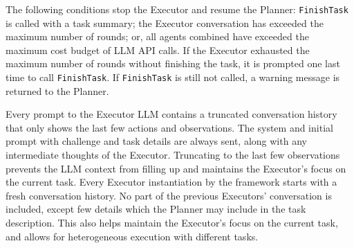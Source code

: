 The following conditions stop the Executor and resume the Planner:
\texttt{FinishTask} is called with a task summary;
the Executor conversation has exceeded the maximum number of rounds;
or, all agents combined have exceeded the maximum cost budget of LLM API calls.
If the Executor exhausted the maximum number of rounds without finishing the task, it is prompted one last time to call \texttt{FinishTask}.
If \texttt{FinishTask} is still not called, a warning message is returned to the Planner.

Every prompt to the Executor LLM contains a truncated conversation history that only shows the last few actions and observations.
The system and initial prompt with challenge and task details are always sent, along with any intermediate thoughts of the Executor.
Truncating to the last few observations prevents the LLM context from filling up and maintains the Executor's focus on the current task.
Every Executor instantiation by the framework starts with a fresh conversation history.
No part of the previous Executors' conversation is included, except few details which the Planner may include in the task description.
This also helps maintain the Executor's focus on the current task, and allows for heterogeneous execution with different tasks.



